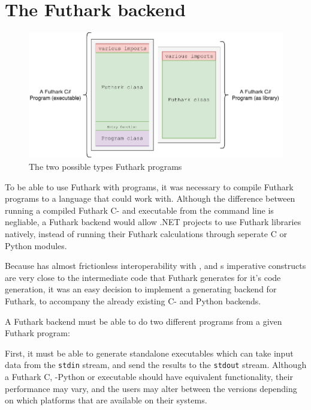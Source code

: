 \chapter{The Futhark \csharp{} backend}

\begin{figure}[h]
  \centering
  \includegraphics[scale=0.85]{chapters/figs/csharp/futharkcs_wide.pdf}
  \caption{The two possible types Futhark \csharp{} programs}
  \label{fig:futharkcsclasses}
\end{figure}

To be able to use Futhark with \fsharp{} programs, it was necessary to compile
Futhark programs to a language that \fsharp{} could work with.
Although the difference between running a compiled Futhark C- and \csharp{}
executable from the command line is negliable, a Futhark \csharp{} backend would
allow .NET projects to use Futhark libraries natively, instead of running their
Futhark calculations through seperate C or Python modules.

Because \fsharp{} has almost frictionless interoperability with \csharp{}, and \csharp{}s
imperative constructs are very close to the intermediate code that Futhark
generates for it's code generation, it was an easy decision to implement a
\csharp{} generating backend for Futhark, to accompany the already existing C-
and Python backends.

A Futhark backend must be able to do two different programs from a given Futhark
program:

First, it must be able to generate standalone executables which can take input data from the \texttt{stdin} stream, and send
the results to the \texttt{stdout} stream. Although a Futhark C, -Python or
\csharp{} executable should have equivalent functionality, their performance may
vary, and the users may alter between the versions depending on which platforms
that are available on their systems.

